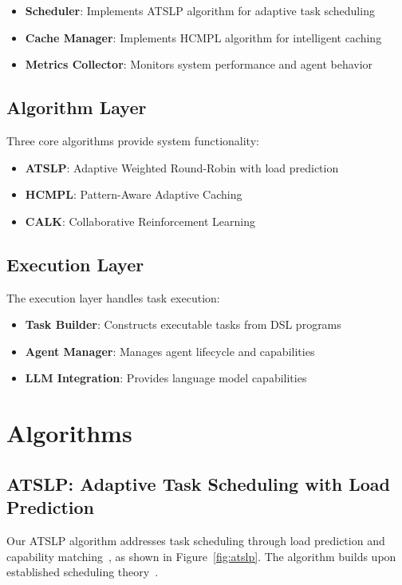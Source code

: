 \documentclass[conference]{IEEEtran}
\begin{document}
\begin{itemize}
\item \textbf{Scheduler}: Implements ATSLP algorithm for adaptive task scheduling
\item \textbf{Cache Manager}: Implements HCMPL algorithm for intelligent caching
\item \textbf{Metrics Collector}: Monitors system performance and agent behavior
\end{itemize}

\subsection{Algorithm Layer}

Three core algorithms provide system functionality:

\begin{itemize}
\item \textbf{ATSLP}: Adaptive Weighted Round-Robin with load prediction
\item \textbf{HCMPL}: Pattern-Aware Adaptive Caching
\item \textbf{CALK}: Collaborative Reinforcement Learning
\end{itemize}

\subsection{Execution Layer}

The execution layer handles task execution:

\begin{itemize}
\item \textbf{Task Builder}: Constructs executable tasks from DSL programs
\item \textbf{Agent Manager}: Manages agent lifecycle and capabilities
\item \textbf{LLM Integration}: Provides language model capabilities
\end{itemize}

\section{Algorithms}

\subsection{ATSLP: Adaptive Task Scheduling with Load Prediction}

Our ATSLP algorithm addresses task scheduling through load prediction and capability matching~\cite{kleinberg2006algorithm}, as shown in Figure~\ref{fig:atslp}. The algorithm builds upon established scheduling theory~\cite{tanenbaum2016structured}.
\end{document}
